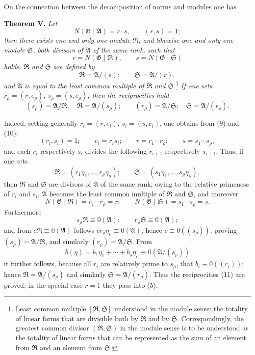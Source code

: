 \documentclass[11pt]{article}
\newcommand{\Amod}{\mathfrak A}
\newcommand{\Gmod}{\mathfrak G}
\newcommand{\Rmod}{\mathfrak R}
\newcommand{\Smod}{\mathfrak S}
\newcommand{\zero}[1]{\equiv 0(#1)}
\newcommand{\Norm}{N}
\begin{document}
On the connection between the decomposition of norms and modules one has

\medskip
\noindent\textbf{Theorem V.} \emph{Let}
\begin{equation}
 \Norm(\Gmod\mid\Amod)=r\cdot s,\qquad (r,s)=1;
\tag{10}
\end{equation}
\emph{then there exists one and only one module $\Rmod$, and likewise one and only one module $\Smod$, both divisors of $\Amod$ of the same rank, such that}
\[
 r=\Norm(\Gmod\mid\Rmod),\qquad s=\Norm(\Gmod\mid\Smod)
\]
\emph{holds. $\Rmod$ and $\Smod$ are defined by}
\[
 \Rmod=\Amod/(s);\qquad \Smod=\Amod/(r),
\]
\emph{and $\Amod$ is equal to the least common multiple of $\Rmod$ and $\Smod$.}\footnote{Least common multiple $[\Rmod,\Smod]$ understood in the module sense: the totality of linear forms that are divisible both by $\Rmod$ and by $\Smod$. Correspondingly, the greatest common divisor $(\Rmod,\Smod)$ in the module sense is to be understood as the totality of linear forms that can be represented as the sum of an element from $\Rmod$ and an element from $\Smod$.}
\emph{If one sets $r_\rho=(r,e_\rho)$, $s_\rho=(s,e_\rho)$, then the reciprocities hold}
\begin{equation}
 (s_\rho)=\Amod/\Rmod;\quad \Rmod=\Amod/(s_\rho);
 \qquad
 (r_\rho)=\Amod/\Smod;\quad \Smod=\Amod/(r_\rho).
\tag{11}
\end{equation}

Indeed, setting generally $r_i=(r,e_i)$, $s_i=(s,e_i)$, one obtains from (9) and (10):
\[
 (r_i,s_i)=1;\qquad e_i=r_is_i;\qquad r=r_1\cdots r_\rho;\qquad s=s_1\cdots s_\rho,
\]
and each $r_i$ respectively $s_i$ divides the following $r_{i+1}$ respectively $s_{i+1}$. Thus, if one sets
\[
 \Rmod=(r_1\eta_1,\ldots,r_\rho\eta_\rho);\qquad
 \Smod=(s_1\eta_1,\ldots,s_\rho\eta_\rho),
\]
then $\Rmod$ and $\Smod$ are divisors of $\Amod$ of the same rank; owing to the relative primeness of $r_i$ and $s_i$, $\Amod$ becomes the least common multiple of $\Rmod$ and $\Smod$, and moreover
\[
 \Norm(\Gmod\mid\Rmod)=r_1\cdots r_\rho=r;\qquad
 \Norm(\Gmod\mid\Smod)=s_1\cdots s_\rho=s.
\]
Furthermore
\[
 s_\rho\Rmod\zero{\Amod};\qquad r_\rho\Smod\zero{\Amod};
\]
and from $c\Rmod\zero{\Amod}$ follows $cr_\rho\eta_\rho\zero{\Amod}$, hence $c\zero{(s_\rho)}$, proving $(s_\rho)=\Amod/\Rmod$, and similarly $(r_\rho)=\Amod/\Smod$. From
\[
 b(\eta)=b_1\eta_1+\cdots+b_\rho\eta_\rho\zero{\Amod/(s_\rho)}
\]
it further follows, because all $r_i$ are relatively prime to $s_\rho$, that $b_i\zero{(r_i)}$; hence $\Rmod=\Amod/(s_\rho)$ and similarly $\Smod=\Amod/(r_\rho)$. Thus the reciprocities (11) are proved; in the special case $r=1$ they pass into (5).
\end{document}
